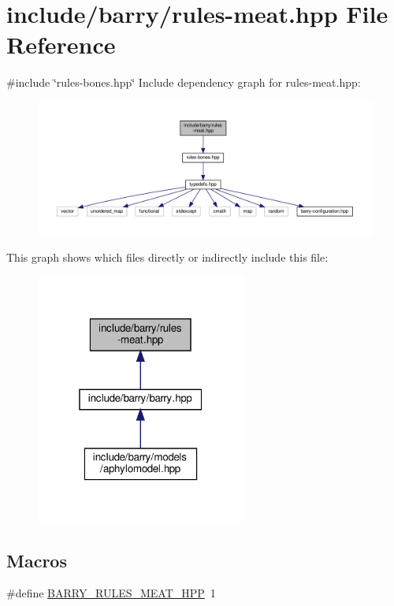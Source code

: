 \hypertarget{rules-meat_8hpp}{}\section{include/barry/rules-\/meat.hpp File Reference}
\label{rules-meat_8hpp}
{\ttfamily \#include \char`\"{}rules-\/bones.\+hpp\char`\"{}}\newline
Include dependency graph for rules-\/meat.hpp\+:
\nopagebreak
\begin{figure}[H]
\begin{center}
\leavevmode
\includegraphics[width=350pt]{rules-meat_8hpp__incl}
\end{center}
\end{figure}
This graph shows which files directly or indirectly include this file\+:
\nopagebreak
\begin{figure}[H]
\begin{center}
\leavevmode
\includegraphics[width=196pt]{rules-meat_8hpp__dep__incl}
\end{center}
\end{figure}
\subsection*{Macros}
\begin{DoxyCompactItemize}
\item 
\#define \hyperlink{barry_8hpp_a22467d89c9ad7e30386746c050a39478}{B\+A\+R\+R\+Y\+\_\+\+R\+U\+L\+E\+S\+\_\+\+M\+E\+A\+T\+\_\+\+H\+PP}~1
\end{DoxyCompactItemize}


